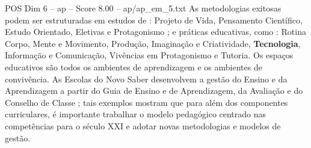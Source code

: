 \begin{textsample}{POS Dim 6 – ap – Score 8.00 – ap/ap\_em\_5.txt}
As metodologias exitosas podem ser estruturadas em estudos de : Projeto de Vida, Pensamento Científico, Estudo Orientado, Eletivas e Protagonismo ; e práticas educativas, como : Rotina Corpo, Mente e Movimento, Produção, Imaginação e Criatividade, \textbf{Tecnologia}, Informação e Comunicação, Vivências em Protagonismo e Tutoria.
Os espaços educativos são todos os ambientes de aprendizagem e os ambientes de convivência.
As Escolas do Novo Saber desenvolvem a gestão do Ensino e da Aprendizagem a partir do Guia de Ensino e de Aprendizagem, da Avaliação e do Conselho de Classe ; tais exemplos mostram que para além dos componentes curriculares, é importante trabalhar o modelo pedagógico centrado nas competências para o século XXI e adotar novas metodologias e modelos de gestão.

\end{textsample}
